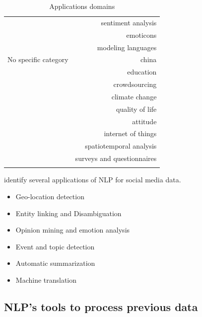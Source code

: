 \begin{center}
\begin{longtable}{ rr }
                              & sentiment analysis              \\
                              & emoticons                       \\
                              & modeling languages              \\
        \hline
        No specific category  & china                           \\
                              & education                       \\
                              & crowdsourcing                   \\
                              & climate change                  \\
                              & quality of life                 \\
                              & attitude                        \\
                              & internet of things              \\
                              & spatiotemporal analysis         \\
                              & surveys and questionnaires      \\
        \hline
        \caption{Applications domains}
        \label{table:application-domains}
    \end{longtable}
\end{center}

\cite{farzindarNaturalLanguageProcessing2017} identify several applications of NLP for social media data.
\begin{itemize}
    \item Geo-location detection
    \item Entity linking and Disambiguation
    \item Opinion mining and emotion analysis
    \item Event and topic detection
    \item Automatic summarization
    \item Machine translation
\end{itemize}

\subsection{NLP's tools to process previous data}

